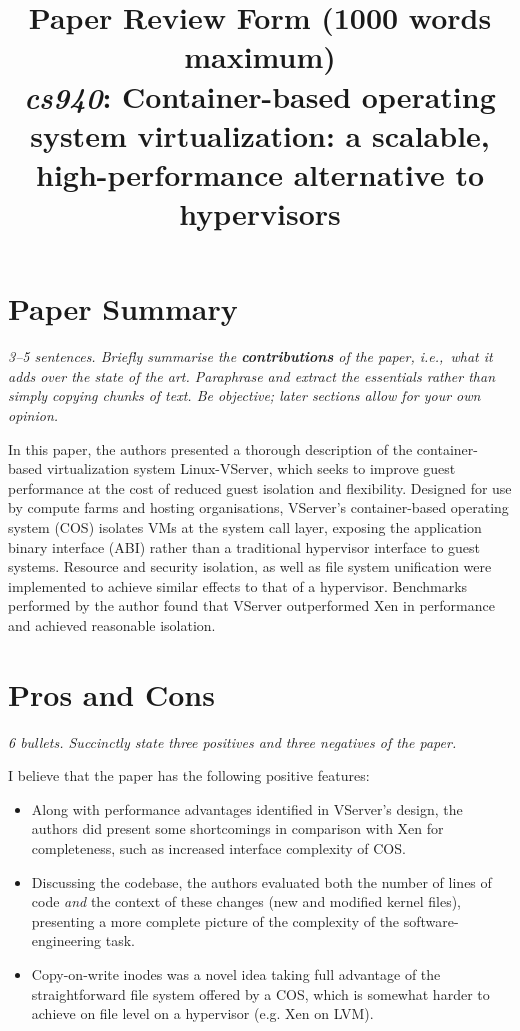 \documentclass[11pt]{article}
\begin{document}
\title{Paper Review Form (1000 words maximum)\\
  \emph{cs940}: Container-based operating system virtualization: a scalable, high-performance alternative to hypervisors \cite{soltesz2007container}}
\maketitle

\section*{Paper Summary}
\textsl{3--5 sentences. Briefly summarise the {\bf contributions} of the paper, i.e.,~what it adds over the state of the art. Paraphrase and extract the essentials rather than simply copying chunks of text. Be objective; later sections allow for your own opinion.}

In this paper, the authors presented a thorough description of the container-based virtualization system Linux-VServer, which seeks to improve guest performance at the cost of reduced guest isolation and flexibility. Designed for use by compute farms and hosting organisations, VServer's container-based operating system (COS) isolates VMs at the system call layer, exposing the application binary interface (ABI) rather than a traditional hypervisor interface to guest systems. Resource and security isolation, as well as file system unification were implemented to achieve similar effects to that of a hypervisor. Benchmarks performed by the author found that VServer outperformed Xen in performance and achieved reasonable isolation.

\section*{Pros and Cons}
\textsl{6 bullets. Succinctly state three positives and three negatives of the paper.}

I believe that the paper has the following positive features:
\begin{itemize}
	\item Along with performance advantages identified in VServer's design, the authors did present some shortcomings in comparison with Xen for completeness, such as increased interface complexity of COS.
	\item Discussing the codebase, the authors evaluated both the number of lines of code \emph{and} the context of these changes (new and modified kernel files), presenting a more complete picture of the complexity of the software-engineering task.
	\item Copy-on-write inodes was a novel idea taking full advantage of the straightforward file system offered by a COS, which is somewhat harder to achieve on file level on a hypervisor (e.g. Xen on LVM).
\end{itemize}
\end{document}
